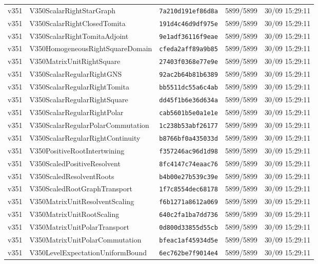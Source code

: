 \documentclass[11pt]{article}
\theoremstyle{definition}\newtheorem{deriv}{Derivation}
\begin{document}
{\begin{longtable}{@{}lllll@{}}
v351 & V350ScalarRightStarGraph & \texttt{7a210d191ef86d8a} & 5899/5899 & 30/09 15:29:11 \\
v351 & V350ScalarRightClosedTomita & \texttt{191d4c46d9df975e} & 5899/5899 & 30/09 15:29:11 \\
v351 & V350ScalarRightTomitaAdjoint & \texttt{9e1adf36116f9eae} & 5899/5899 & 30/09 15:29:11 \\
v351 & V350HomogeneousRightSquareDomain & \texttt{cfeda2aff89a9b85} & 5899/5899 & 30/09 15:29:11 \\
v351 & V350MatrixUnitRightSquare & \texttt{27403f0368e77e9e} & 5899/5899 & 30/09 15:29:11 \\
v351 & V350ScalarRegularRightGNS & \texttt{92ac2b64b81b6389} & 5899/5899 & 30/09 15:29:11 \\
v351 & V350ScalarRegularRightTomita & \texttt{bb5511dc55a6c4ab} & 5899/5899 & 30/09 15:29:11 \\
v351 & V350ScalarRegularRightSquare & \texttt{dd45f1b6e36d634a} & 5899/5899 & 30/09 15:29:11 \\
v351 & V350ScalarRegularRightPolar & \texttt{cab5601b5e0a1e1e} & 5899/5899 & 30/09 15:29:11 \\
v351 & V350ScalarRegularPolarCommutation & \texttt{1c238b53abf26177} & 5899/5899 & 30/09 15:29:11 \\
v351 & V350ScalarRegularRightContinuity & \texttt{b8766bf0a435033d} & 5899/5899 & 30/09 15:29:11 \\
v351 & V350PositiveRootIntertwining & \texttt{f357246ac96d1d98} & 5899/5899 & 30/09 15:29:11 \\
v351 & V350ScaledPositiveResolvent & \texttt{8fc4147c74eaac76} & 5899/5899 & 30/09 15:29:11 \\
v351 & V350ScaledResolventRoots & \texttt{b4b00e27b539c39e} & 5899/5899 & 30/09 15:29:11 \\
v351 & V350ScaledRootGraphTransport & \texttt{1f7c8554dec68178} & 5899/5899 & 30/09 15:29:11 \\
v351 & V350MatrixUnitResolventScaling & \texttt{f6b1271a8612a069} & 5899/5899 & 30/09 15:29:11 \\
v351 & V350MatrixUnitRootScaling & \texttt{640c2fa1ba7dd736} & 5899/5899 & 30/09 15:29:11 \\
v351 & V350MatrixUnitPolarTransport & \texttt{0d800d33855d55cb} & 5899/5899 & 30/09 15:29:11 \\
v351 & V350MatrixUnitPolarCommutation & \texttt{bfeac1af45934d5e} & 5899/5899 & 30/09 15:29:11 \\
v351 & V350LevelExpectationUniformBound & \texttt{6ec762be7f9014e4} & 5899/5899 & 30/09 15:29:11 \\

\end{longtable}}
\end{document}

